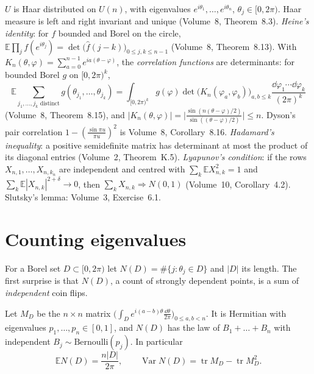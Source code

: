 \begin{reminder}
$U$ is Haar distributed on $U(n)$, with eigenvalues $e^{i\theta_1},\dots,e^{i\theta_n}$, $\theta_j\in[0,2\pi)$. Haar measure is left and right invariant and unique (Volume~8, Theorem~8.3). \emph{Heine's identity}: for $f$ bounded and
Borel on the circle, $\mathbb E\prod_jf(e^{i\theta_j})=\det\bigl(\hat f(j-k)\bigr)_{0\le j,k\le n-1}$ (Volume~8, Theorem~8.13). With $K_n(\theta,\varphi)=\sum_{a=0}^{n-1}e^{ia(\theta-\varphi)}$, the \emph{correlation functions} are determinants: for bounded Borel
$g$ on $[0,2\pi)^k$,
\[
\mathbb E\sum_{j_1,\dots,j_k\text{ distinct}}g(\theta_{j_1},\dots,\theta_{j_k})=\int_{[0,2\pi)^k}g(\varphi)\det\bigl(K_n(\varphi_a,\varphi_b)\bigr)_{a,b\le k}\frac{\dd\varphi_1\cdots\dd\varphi_k}{(2\pi)^k}
\]
(Volume~8, Theorem~8.15), and $|K_n(\theta,\varphi)|=\bigl|\frac{\sin(n(\theta-\varphi)/2)}{\sin((\theta-\varphi)/2)}\bigr|\le n$. Dyson's pair correlation $1-(\frac{\sin\pi u}{\pi u})^2$ is Volume~8, Corollary~8.16. \emph{Hadamard's inequality}: a positive semidefinite
matrix has determinant at most the product of its diagonal entries (Volume~2, Theorem~K.5). \emph{Lyapunov's condition}: if the rows $X_{n,1},\dots,X_{n,k_n}$ are independent and centred with $\sum_k\mathbb EX_{n,k}^2=1$ and
$\sum_k\mathbb E|X_{n,k}|^{2+\delta}\to0$, then $\sum_kX_{n,k}\Rightarrow N(0,1)$ (Volume~10, Corollary~4.2). Slutsky's lemma: Volume~3, Exercise~6.1.
\end{reminder}

\section{Counting eigenvalues}

For a Borel set $D\subset[0,2\pi)$ let $N(D)=\#\{j:\theta_j\in D\}$ and $|D|$ its length. The first surprise is that $N(D)$, a count of strongly dependent points, is a sum of \emph{independent} coin flips.

\begin{proposition}\label{prop:bernoulli}
Let $M_D$ be the $n\times n$ matrix $\bigl(\int_De^{i(a-b)\theta}\frac{\dd\theta}{2\pi}\bigr)_{0\le a,b<n}$. It is Hermitian with eigenvalues $p_1,\dots,p_n\in[0,1]$, and $N(D)$ has the law of $B_1+\dots+B_n$ with independent $B_j\sim\mathrm{Bernoulli}(p_j)$. In particular
\[
\mathbb EN(D)=\frac{n|D|}{2\pi},\qquad\operatorname{Var}N(D)=\operatorname{tr}M_D-\operatorname{tr}M_D^2.
\]
\end{proposition}

